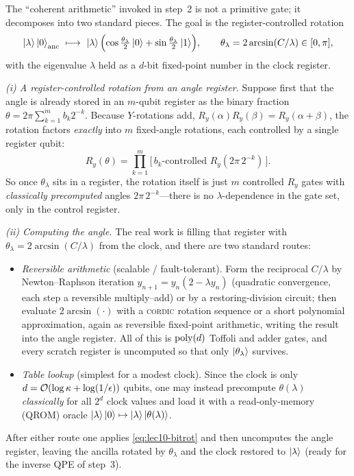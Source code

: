 \begin{remark}
\label{rem:lec10-cr-impl}
The ``coherent arithmetic'' invoked in step~2 is not a primitive gate; it decomposes into
two standard pieces. The goal is the register-controlled rotation
\begin{equation}
  \ket\lambda\ket0_{\mathrm{anc}}\ \longmapsto\
  \ket\lambda\Bigl(\cos\tfrac{\theta_\lambda}{2}\ket0+\sin\tfrac{\theta_\lambda}{2}\ket1\Bigr),
  \qquad \theta_\lambda=2\arcsin(C/\lambda)\in[0,\pi],
  \label{eq:lec10-cr-goal}
\end{equation}
with the eigenvalue $\lambda$ held as a $d$-bit fixed-point number in the clock register.

\emph{(i) A register-controlled rotation from an angle register.} Suppose first that the
angle is already stored in an $m$-qubit register as the binary fraction
$\theta=2\pi\sum_{k=1}^m b_k 2^{-k}$. Because $Y$-rotations add,
$R_y(\alpha)R_y(\beta)=R_y(\alpha+\beta)$, the rotation factors \emph{exactly} into $m$
fixed-angle rotations, each controlled by a single register qubit:
\begin{equation}
  R_y(\theta)=\prod_{k=1}^m\bigl[\,b_k\text{-controlled }R_y(2\pi\,2^{-k})\,\bigr].
  \label{eq:lec10-bitrot}
\end{equation}
So once $\theta_\lambda$ sits in a register, the rotation itself is just $m$ controlled
$R_y$ gates with \emph{classically precomputed} angles $2\pi\,2^{-k}$---there is no
$\lambda$-dependence in the gate set, only in the control register.

\emph{(ii) Computing the angle.} The real work is filling that register with
$\theta_\lambda=2\arcsin(C/\lambda)$ from the clock, and there are two standard routes:
\begin{itemize}[leftmargin=1.4em,nosep]
  \item \emph{Reversible arithmetic} (scalable / fault-tolerant). Form the reciprocal
    $C/\lambda$ by Newton--Raphson iteration $y_{n+1}=y_n(2-\lambda y_n)$ (quadratic
    convergence, each step a reversible multiply--add) or by a restoring-division circuit;
    then evaluate $2\arcsin(\cdot)$ with a \textsc{cordic} rotation sequence or a short
    polynomial approximation, again as reversible fixed-point arithmetic, writing the
    result into the angle register. All of this is $\operatorname{poly}(d)$ Toffoli and adder gates, and
    every scratch register is uncomputed so that only $\ket{\theta_\lambda}$ survives.
  \item \emph{Table lookup} (simplest for a modest clock). Since the clock is only
    $d=\mathcal{O}(\log\kappa+\log(1/\epsilon))$ qubits, one may instead precompute
    $\theta(\lambda)$ \emph{classically} for all $2^d$ clock values and load it with a
    read-only-memory (QROM) oracle
    $\ket\lambda\ket0\mapsto\ket\lambda\ket{\theta(\lambda)}$.
\end{itemize}
After either route one applies \eqref{eq:lec10-bitrot} and then uncomputes the angle
register, leaving the ancilla rotated by $\theta_\lambda$ and the clock restored to
$\ket\lambda$ (ready for the inverse QPE of step~3).


\end{remark}
